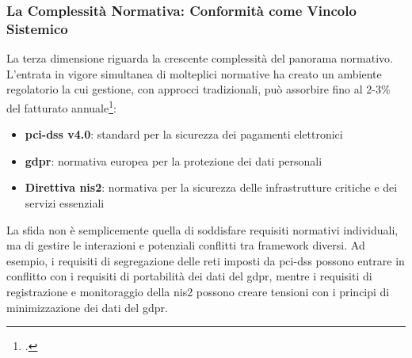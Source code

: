 \subsubsection{\texorpdfstring{\textbf{La Complessità Normativa: Conformità come Vincolo Sistemico}}{La Complessità Normativa: Conformità come Vincolo Sistemico}}
\label{subsubsec:complessita_normativa}

La terza dimensione riguarda la crescente complessità del panorama normativo. L'entrata in vigore simultanea di molteplici normative ha creato un ambiente regolatorio la cui gestione, con approcci tradizionali, può assorbire fino al 2-3\% del fatturato annuale\footcite{ponemon2024compliance}:

\begin{itemize}
\item \textbf{\gls{pci-dss} v4.0}: standard per la sicurezza dei pagamenti elettronici
\item \textbf{\gls{gdpr}}: normativa europea per la protezione dei dati personali
\item \textbf{Direttiva \gls{nis2}}: normativa per la sicurezza delle infrastrutture critiche e dei servizi essenziali
\end{itemize}

La sfida non è semplicemente quella di soddisfare requisiti normativi individuali, ma di gestire le interazioni e potenziali conflitti tra framework diversi. Ad esempio, i requisiti di segregazione delle reti imposti da \gls{pci-dss} possono entrare in conflitto con i requisiti di portabilità dei dati del \gls{gdpr}, mentre i requisiti di registrazione e monitoraggio della \gls{nis2} possono creare tensioni con i principi di minimizzazione dei dati del \gls{gdpr}.

